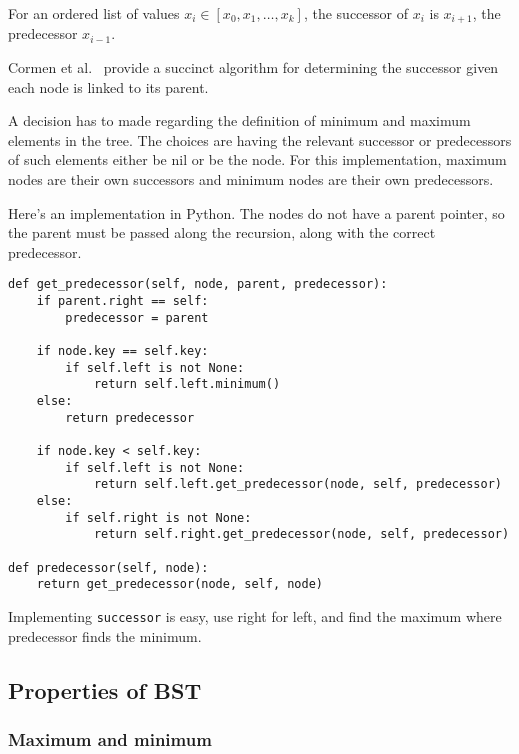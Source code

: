 \documentclass{article}
\begin{document}
\setcounter{sno}{0}

\sno For an ordered list of values $x_i \in [x_0, x_1,\ldots,x_k]$, the successor of
$x_i$ is $x_{i+1}$, the predecessor $x_{i-1}$.

\sno Cormen et al.~\cite[p. 248-249]{cormen:th:1990} provide a succinct algorithm for
determining the successor given each node is linked to its parent.

\sno A decision has to made regarding the definition of minimum and maximum
elements in the tree. \sno The choices are having the relevant successor or
predecessors of such elements either be nil or be the node. \sno For this implementation,
maximum nodes are their own successors and minimum nodes are their
own predecessors.

\sno Here's an implementation in Python. \sno The nodes do not have a parent
pointer, so the parent must be passed along the recursion, along with
the correct predecessor.

\begin{lstlisting}[frame=single]
def get_predecessor(self, node, parent, predecessor):
    if parent.right == self:
        predecessor = parent

    if node.key == self.key:
        if self.left is not None:
            return self.left.minimum()
    else:
        return predecessor

    if node.key < self.key:
        if self.left is not None:
            return self.left.get_predecessor(node, self, predecessor)
    else:
        if self.right is not None:
            return self.right.get_predecessor(node, self, predecessor)

def predecessor(self, node):
    return get_predecessor(node, self, node)
\end{lstlisting}

\sno Implementing {\tt successor} is easy, use right for left, and find the
maximum where predecessor finds the minimum.



\subsection{Properties of BST}


\subsubsection{Maximum and minimum}

\setcounter{sno}{0}
\end{document}
